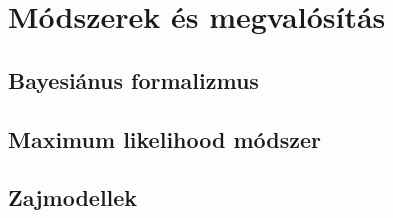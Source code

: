 \section{Módszerek és megvalósítás}

\subsection{Bayesiánus formalizmus}

\subsection{Maximum likelihood módszer}

\subsection{Zajmodellek}